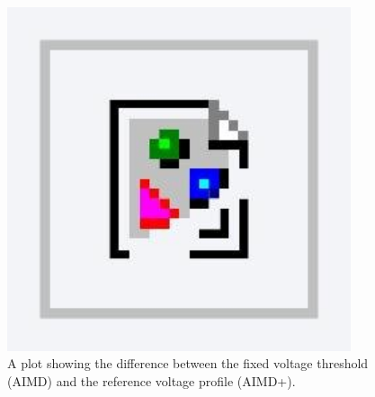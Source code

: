 \begin{figure}\centering
 \includegraphics[width=0.90\textwidth]{foo}
 \caption{A plot showing the difference between the fixed voltage threshold (AIMD) and the reference voltage profile (AIMD+).}
 \label{fig-ref-voltage-plot}
\end{figure}
